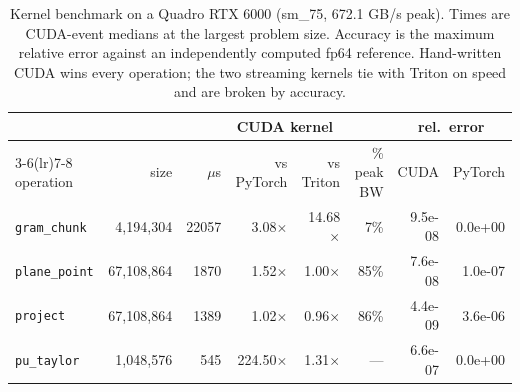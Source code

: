 \begin{table}[t]
\centering
\caption{Kernel benchmark on a Quadro RTX 6000 (sm\_75, 672.1 GB/s peak).
Times are CUDA-event medians at the largest problem size. Accuracy is the maximum
relative error against an independently computed fp64 reference. Hand-written CUDA wins
every operation; the two streaming kernels tie with Triton on speed and are broken by
accuracy.}
\label{tab:kernels}
\begin{tabular}{lrrrrrrr}
\toprule
& & \multicolumn{4}{c}{CUDA kernel} & \multicolumn{2}{c}{rel.\ error} \\
\cmidrule(lr){3-6}\cmidrule(lr){7-8}
operation & size & $\mu$s & vs PyTorch & vs Triton & \% peak BW & CUDA & PyTorch \\
\midrule
\texttt{gram\_chunk} & 4{,}194{,}304 & 22057 & 3.08$\times$ & 14.68$\times$ & 7\% & 9.5e-08 & 0.0e+00 \\
\texttt{plane\_point} & 67{,}108{,}864 & 1870 & 1.52$\times$ & 1.00$\times$ & 85\% & 7.6e-08 & 1.0e-07 \\
\texttt{project} & 67{,}108{,}864 & 1389 & 1.02$\times$ & 0.96$\times$ & 86\% & 4.4e-09 & 3.6e-06 \\
\texttt{pu\_taylor} & 1{,}048{,}576 & 545 & 224.50$\times$ & 1.31$\times$ & --- & 6.6e-07 & 0.0e+00 \\
\bottomrule
\end{tabular}
\end{table}


